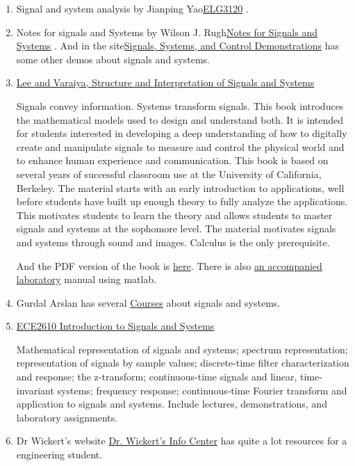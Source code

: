 \documentclass[koma,utopia,letterpaper,captions=tableheading,11pt,listings-sv,microtype,paralist,colorlinks=true,urlcolor=blue]{org-article}
\begin{document}
\begin{enumerate}
\item Signal and system analysis by Jianping Yao\href{http://www.site.uottawa.ca/\~jpyao/courses/E3125B\_Fall\_2019.html}{ELG3120} .

\item Notes for signals and Systems by Wilson J. Rugh\href{https://pages.jh.edu/\~bcooper8/sigma\_files/courses/214/signalsandsystemsnotes.pdf}{Notes for Signals and Systems}
. And in the site\href{https://pages.jh.edu/\~signals/}{Signals, Systems, and Control Demonstrations} has some other
demos about signals and systems.

\item \href{https://ptolemy.berkeley.edu/books/leevaraiya/}{Lee and Varaiya, Structure and Interpretation of Signals and Systems}

Signals convey information. Systems transform signals. This book introduces
the mathematical models used to design and understand both. It is intended
for students interested in developing a deep understanding of how to
digitally create and manipulate signals to measure and control the physical
world and to enhance human experience and communication. This book is based
on several years of successful classroom use at the University of California,
Berkeley. The material starts with an early introduction to applications,
well before students have built up enough theory to fully analyze the
applications. This motivates students to learn the theory and allows students
to master signals and systems at the sophomore level. The material motivates
signals and systems through sound and images. Calculus is the only
prerequisite.

 And the PDF version of the book is \href{https://ptolemy.berkeley.edu/books/leevaraiya/releases/LeeVaraiya\_DigitalV2\_04.pdf}{here}. There is also \href{https://ptolemy.berkeley.edu/books/leevaraiya/releases/LabManualV1\_AddisonWesley.pdf}{an accompanied
laboratory} manual using matlab.

\item Gurdal Arslan has several \href{http://www2.hawaii.edu/\~gurdal/index\_files/Page386.htm}{Courses} about signals and systems.

\item \href{http://www.eas.uccs.edu/\~mwickert/ece2610/}{ECE2610 Introduction to Signals and Systems}

Mathematical representation of signals and systems; spectrum representation;
representation of signals by sample values; discrete-time filter
characterization and response; the z-transform; continuous-time signals and
linear, time-invariant systems; frequency response; continuous-time Fourier
transform and application to signals and systems. Include lectures,
demonstrations, and laboratory assignments.

\item Dr Wickert's website \href{http://www.eas.uccs.edu/\~mwickert/}{Dr. Wickert's Info Center}  has quite a lot resources
for a engineering student.
\end{enumerate}
\end{document}
